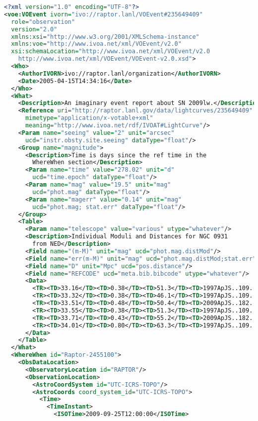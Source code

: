 \documentclass[11pt,a4paper]{ivoa}
\begin{document}
\begin{lstlisting}[language=XML]
<?xml version="1.0" encoding="UTF-8"?>
<voe:VOEvent ivorn="ivo://raptor.lanl/VOEvent#235649409"
  role="observation"
  version="2.0"
  xmlns:xsi="http://www.w3.org/2001/XMLSchema-instance"
  xmlns:voe="http://www.ivoa.net/xml/VOEvent/v2.0"
  xsi:schemaLocation="http://www.ivoa.net/xml/VOEvent/v2.0
    http://www.ivoa.net/xml/VOEvent/VOEvent-v2.0.xsd">
  <Who>
    <AuthorIVORN>ivo://raptor.lanl/organization</AuthorIVORN>
    <Date>2005-04-15T14:34:16</Date>
  </Who>
  <What>
    <Description>An imaginary event report about SN 2009lw.</Description>
    <Reference uri="http://raptor.lanl.gov/data/lightcurves/235649409"
      mimetype="application/x-votable+xml"
      meaning="http://www.ivoa.net/rdf/IVOAT#LightCurve"/>
    <Param name="seeing" value="2" unit="arcsec"
      ucd="instr.obsty.site.seeing" dataType="float"/>
    <Group name="magnitude">
      <Description>Time is days since the ref time in the
        WhereWhen section</Description>
      <Param name="time" value="278.02" unit="d"
        ucd="time.epoch" dataType="float"/>
      <Param name="mag" value="19.5" unit="mag"
        ucd="phot.mag" dataType="float"/>
      <Param name="magerr" value="0.14" unit="mag"
        ucd="phot.mag; stat.err" dataType="float"/>
    </Group>
    <Table>
      <Param name="telescope" value="various" utype="whatever"/>
      <Description>Individual Moduli and Distances for NGC 0931
        from NED</Description>
      <Field name="(m-M)" unit="mag" ucd="phot.mag.distMod"/>
      <Field name="err(m-M)" unit="mag" ucd="phot.mag.distMod;stat.err"/>
      <Field name="D" unit="Mpc" ucd="pos.distance"/>
      <Field name="REFCODE" ucd="meta.bib.bibcode" utype="whatever"/>
      <Data>
        <TR><TD>33.16</TD><TD>0.38</TD><TD>51.3</TD><TD>1997ApJS..109..333W</TD></TR>
        <TR><TD>33.32</TD><TD>0.38</TD><TD>46.1</TD><TD>1997ApJS..109..333W</TD></TR>
        <TR><TD>33.51</TD><TD>0.48</TD><TD>50.4</TD><TD>2009ApJS..182..474S</TD></TR>
        <TR><TD>33.55</TD><TD>0.38</TD><TD>51.3</TD><TD>1997ApJS..109..333W</TD></TR>
        <TR><TD>33.71</TD><TD>0.43</TD><TD>55.2</TD><TD>2009ApJS..182..474S</TD></TR>
        <TR><TD>34.01</TD><TD>0.80</TD><TD>63.3</TD><TD>1997ApJS..109..333W</TD></TR>
      </Data>
    </Table>
  </What>
  <WhereWhen id="Raptor-2455100">
    <ObsDataLocation>
      <ObservatoryLocation id="RAPTOR"/>
      <ObservationLocation>
        <AstroCoordSystem id="UTC-ICRS-TOPO"/>
        <AstroCoords coord_system_id="UTC-ICRS-TOPO">
          <Time>
            <TimeInstant>
              <ISOTime>2009-09-25T12:00:00</ISOTime>

\end{lstlisting}
\end{document}
